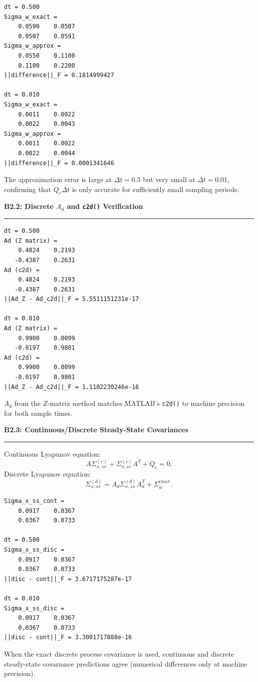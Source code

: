 \documentclass[12pt]{article}
\newcommand{\questionpart}[1]{%
  \vspace{0.35cm}
  {\noindent\normalsize \textbf{#1}}
  \vspace{0.15cm}
  \hrule
  \vspace{0.1cm}
}
\begin{document}
\begin{outputbox}
\begin{lstlisting}[style=output]
dt = 0.500
Sigma_w_exact =
    0.0590    0.0507
    0.0507    0.0591
Sigma_w_approx =
    0.0550    0.1100
    0.1100    0.2200
||difference||_F = 0.1814999427

dt = 0.010
Sigma_w_exact =
    0.0011    0.0022
    0.0022    0.0043
Sigma_w_approx =
    0.0011    0.0022
    0.0022    0.0044
||difference||_F = 0.0001341646
\end{lstlisting}
\end{outputbox}

\begin{resultsbox}
The approximation error is large at $\Delta t=0.5$ but very small at $\Delta t=0.01$, confirming that $Q_c\Delta t$ is only accurate for sufficiently small sampling periods.
\end{resultsbox}

\questionpart{B2.2: Discrete $A_d$ and \texttt{c2d()} Verification}\label{prob:b2b}

\begin{outputbox}
\begin{lstlisting}[style=output]
dt = 0.500
Ad (Z matrix) =
    0.4824    0.2193
   -0.4387    0.2631
Ad (c2d) =
    0.4824    0.2193
   -0.4387    0.2631
||Ad_Z - Ad_c2d||_F = 5.5511151231e-17

dt = 0.010
Ad (Z matrix) =
    0.9900    0.0099
   -0.0197    0.9801
Ad (c2d) =
    0.9900    0.0099
   -0.0197    0.9801
||Ad_Z - Ad_c2d||_F = 1.1102230246e-16
\end{lstlisting}
\end{outputbox}

\begin{resultsbox}
$A_d$ from the $Z$-matrix method matches MATLAB's \texttt{c2d()} to machine precision for both sample times.
\end{resultsbox}

\questionpart{B2.3: Continuous/Discrete Steady-State Covariances}\label{prob:b2c}
Continuous Lyapunov equation:
\[
A\Sigma_{x,ss}^{(c)} + \Sigma_{x,ss}^{(c)}A^T + Q_c = 0.
\]
Discrete Lyapunov equation:
\[
\Sigma_{x,ss}^{(d)} = A_d\Sigma_{x,ss}^{(d)}A_d^T + \Sigma_{\tilde w}^{\text{exact}}.
\]

\begin{outputbox}
\begin{lstlisting}[style=output]
Sigma_x_ss_cont =
    0.0917    0.0367
    0.0367    0.0733

dt = 0.500
Sigma_x_ss_disc =
    0.0917    0.0367
    0.0367    0.0733
||disc - cont||_F = 3.6717175287e-17

dt = 0.010
Sigma_x_ss_disc =
    0.0917    0.0367
    0.0367    0.0733
||disc - cont||_F = 3.3001717888e-16
\end{lstlisting}
\end{outputbox}

\begin{resultsbox}
When the exact discrete process covariance is used, continuous and discrete steady-state covariance predictions agree (numerical differences only at machine precision).
\end{resultsbox}
\end{document}
